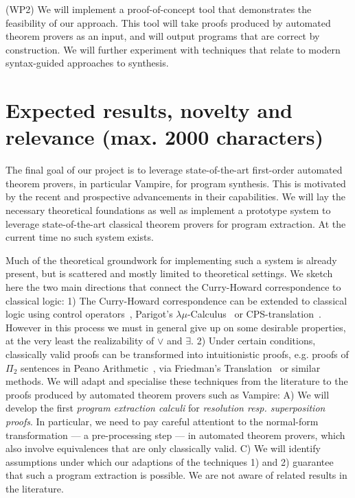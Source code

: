 \documentclass[a4paper,12pt]{article}
\begin{document}
(WP2) We will implement a proof-of-concept tool that demonstrates the feasibility of our approach.
This tool will take proofs produced by automated theorem provers as an input, and will output programs that are correct by construction.
We will further experiment with techniques that relate to modern syntax-guided approaches to synthesis.


\section{Expected results, novelty and relevance (max. 2000 characters)}

The final goal of our project is to leverage state-of-the-art first-order automated
theorem provers, in particular Vampire, for program synthesis. 
This is motivated by the recent and prospective advancements in their capabilities.
We will lay the necessary theoretical foundations as well as implement a prototype system to leverage state-of-the-art classical theorem provers for program extraction. 
At the current time no such system exists. 

Much of the theoretical groundwork for implementing such a system is already present,
but is scattered and mostly limited to theoretical settings.
We sketch here the two main directions that connect the Curry-Howard correspondence to classical logic:
1) The Curry-Howard correspondence can be extended to classical logic using control operators~\cite{Control1}, Parigot's $\lambda\mu$-Calculus~\cite{Parigot1} or CPS-translation~\cite{CPS1}.
However in this process we must in general give up on some desirable properties, at the very least the realizability of $\vee$ and $\exists$.
2) Under certain conditions, classically valid proofs can be transformed into intuitionistic proofs, e.g. proofs of $\Pi_2$ sentences in Peano Arithmetic~\cite{HAPA}, via Friedman's Translation~\cite{Friedman} or similar methods.
We will adapt and specialise these techniques from the literature to the proofs produced by automated theorem provers such as Vampire:
A) We will develop the first\emph{ program extraction calculi} for \emph{resolution resp. superposition proofs}.
In particular, we need to pay careful attentiont to the normal-form transformation --- a pre-processing step --- in automated theorem provers, which also involve equivalences that are only classically valid.
C) We will identify assumptions under which our adaptions of the techniques 1) and 2) guarantee that such a program extraction is possible.
We are not aware of related results in the literature.
\end{document}
